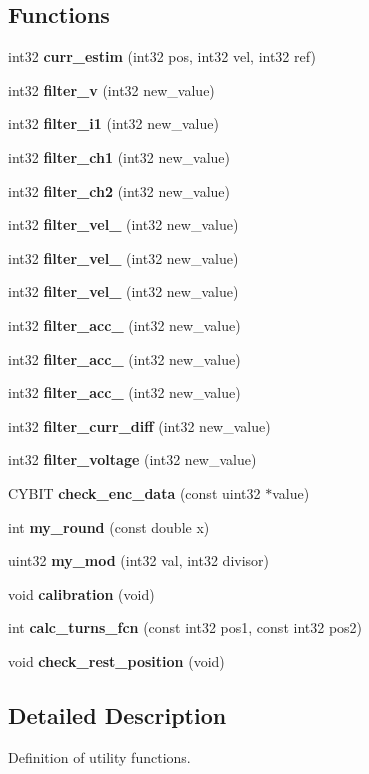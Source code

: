 \subsection*{Functions}
\begin{DoxyCompactItemize}
\item 
int32 \textbf{ curr\+\_\+estim} (int32 pos, int32 vel, int32 ref)
\item 
int32 \textbf{ filter\+\_\+v} (int32 new\+\_\+value)
\item 
int32 \textbf{ filter\+\_\+i1} (int32 new\+\_\+value)
\item 
int32 \textbf{ filter\+\_\+ch1} (int32 new\+\_\+value)
\item 
int32 \textbf{ filter\+\_\+ch2} (int32 new\+\_\+value)
\item 
int32 \textbf{ filter\+\_\+vel\+\_} (int32 new\+\_\+value)
\item 
int32 \textbf{ filter\+\_\+vel\+\_} (int32 new\+\_\+value)
\item 
int32 \textbf{ filter\+\_\+vel\+\_} (int32 new\+\_\+value)
\item 
int32 \textbf{ filter\+\_\+acc\+\_} (int32 new\+\_\+value)
\item 
int32 \textbf{ filter\+\_\+acc\+\_} (int32 new\+\_\+value)
\item 
int32 \textbf{ filter\+\_\+acc\+\_} (int32 new\+\_\+value)
\item 
int32 \textbf{ filter\+\_\+curr\+\_\+diff} (int32 new\+\_\+value)
\item 
int32 \textbf{ filter\+\_\+voltage} (int32 new\+\_\+value)
\item 
C\+Y\+B\+IT \textbf{ check\+\_\+enc\+\_\+data} (const uint32 $\ast$value)
\item 
int \textbf{ my\+\_\+round} (const double x)
\item 
uint32 \textbf{ my\+\_\+mod} (int32 val, int32 divisor)
\item 
void \textbf{ calibration} (void)
\item 
int \textbf{ calc\+\_\+turns\+\_\+fcn} (const int32 pos1, const int32 pos2)
\item 
void \textbf{ check\+\_\+rest\+\_\+position} (void)
\end{DoxyCompactItemize}


\subsection{Detailed Description}
Definition of utility functions. 

